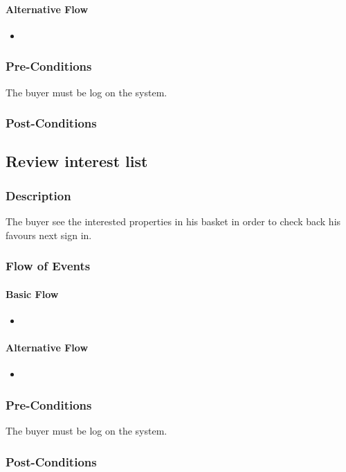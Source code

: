 \documentclass[a4paper,12pt]{article}
\begin{document}
\paragraph{Alternative Flow}
\begin{itemize}
\item
\end{itemize}
\subsubsection{Pre-Conditions}
The buyer must be log on the system.
\subsubsection{Post-Conditions}

\subsection{Review interest list}
\subsubsection{Description}
The buyer see the interested properties in his basket in order to check back his favours next sign in.
\subsubsection{Flow of Events}
\paragraph{Basic Flow}
\begin{itemize}
\item
\end{itemize}
\paragraph{Alternative Flow}
\begin{itemize}
\item
\end{itemize}
\subsubsection{Pre-Conditions}
The buyer must be log on the system.
\subsubsection{Post-Conditions}
\end{document}
